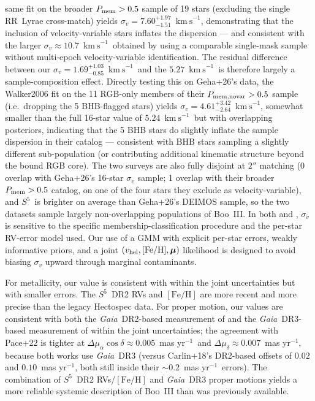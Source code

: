 \documentclass[twocolumn]{aastex631}
\newcommand{\SSSSS}{${S}^5$\xspace}
\newcommand{\gaia}{\textit{Gaia}\xspace}
\newcommand{\vlosUnits}{$\mathrm{km~s}^{-1}$\xspace}
\newcommand{\pmUnits}{mas yr$^{-1}$\xspace}
\begin{document}
same fit on the broader $P_{\rm mem} > 0.5$ sample of 19 stars (excluding the single RR~Lyrae cross-match) yields $\sigma_v = 7.60^{+1.97}_{-1.51}$~\vlosUnits, demonstrating that the inclusion of velocity-variable stars inflates the dispersion --- and consistent with the larger $\sigma_v \approx 10.7$~\vlosUnits\ obtained by \citet{Carlin2018} using a comparable single-mask sample without multi-epoch velocity-variable identification.  The residual difference between our $\sigma_v = 1.69^{+1.03}_{-0.85}$~\vlosUnits\ and the \citet{Geha2026} $5.27$~\vlosUnits\ is therefore largely a sample-composition effect.  Directly testing this on Geha+26's data, the Walker2006 fit on the 11 RGB-only members of their $P_{\rm mem,novar} > 0.5$ sample (i.e.\ dropping the 5 BHB-flagged stars) yields $\sigma_v = 4.61^{+3.42}_{-2.64}$~\vlosUnits, somewhat smaller than the full 16-star value of $5.24$~\vlosUnits\ but with overlapping posteriors, indicating that the 5 BHB stars do slightly inflate the sample dispersion in their catalog --- consistent with BHB stars sampling a slightly different sub-population (or contributing additional kinematic structure beyond the bound RGB core).  The two surveys are also fully disjoint at $2''$ matching (0 overlap with Geha+26's 16-star $\sigma_v$ sample; 1 overlap with their broader $P_{\rm mem} > 0.5$ catalog, on one of the four stars they exclude as velocity-variable), and \SSSSS\ is brighter on average than Geha+26's DEIMOS sample, so the two datasets sample largely non-overlapping populations of Boo~III. In both \citet{Carlin2018} and \citet{Geha2026}, $\sigma_v$ is sensitive to the specific membership-classification procedure and the per-star RV-error model used.  Our use of a GMM with explicit per-star errors, weakly informative priors, and a joint $(v_{\rm hel}, [\mathrm{Fe/H}], \boldsymbol\mu)$ likelihood is designed to avoid biasing $\sigma_v$ upward through marginal contaminants.

For metallicity, our value is consistent with \citet{Carlin2018} within the joint uncertainties but with smaller errors. The \SSSSS\ DR2 RVs and $[\mathrm{Fe/H}]$ are more recent and more precise than the legacy Hectospec data.  For proper motion, our values are consistent with both the \gaia~DR2-based measurement of \citet{Carlin2018} and the \gaia~DR3-based measurement of \citet{Pace2022} within the joint uncertainties; the agreement with Pace+22 is tighter at $\Delta\mu_\alpha\cos\delta \approx 0.005$~\pmUnits\ and $\Delta\mu_\delta \approx 0.007$~\pmUnits, because both works use \gaia\ DR3 (versus Carlin+18's DR2-based offsets of $0.02$ and $0.10$~\pmUnits, both still inside their $\sim 0.2$~\pmUnits\ errors). The combination of \SSSSS\ DR2 RVs/$[\mathrm{Fe/H}]$ and \gaia\ DR3 proper motions yields a more reliable systemic description of Boo~III than was previously available.
\end{document}
